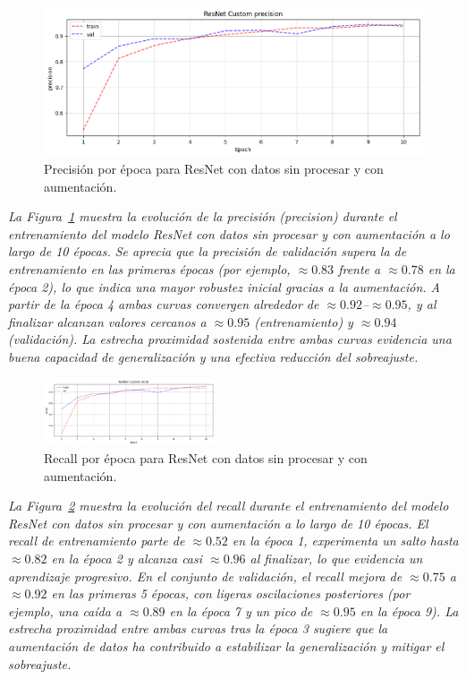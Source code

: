 \documentclass[conference]{IEEEtran}
\begin{document}
\begin{figure}[H]
    \centering
    \includegraphics[width=0.95\linewidth]{graphics-resnet-raw/resnet_raw_with_precision.png}
    \caption{Precisión por época para ResNet con datos sin procesar y con aumentación.}
    \label{fig:resnet_raw_with_precision}
\end{figure}
\noindent\textit{%
La Figura~\ref{fig:resnet_raw_with_precision} muestra la evolución de la precisión (precision) durante el entrenamiento del modelo ResNet con datos sin procesar y con aumentación a lo largo de 10 épocas. Se aprecia que la precisión de validación supera la de entrenamiento en las primeras épocas (por ejemplo, \(\approx0.83\) frente a \(\approx0.78\) en la época 2), lo que indica una mayor robustez inicial gracias a la aumentación. A partir de la época 4 ambas curvas convergen alrededor de \(\approx0.92\)–\(\approx0.95\), y al finalizar alcanzan valores cercanos a \(\approx0.95\) (entrenamiento) y \(\approx0.94\) (validación). La estrecha proximidad sostenida entre ambas curvas evidencia una buena capacidad de generalización y una efectiva reducción del sobreajuste.%
}

\begin{figure}[H]
    \centering
    \includegraphics[width=0.45\textwidth]{graphics-resnet-raw/resnet_raw_with_recall.png}
    \caption{Recall por época para ResNet con datos sin procesar y con aumentación.}
    \label{fig:resnet_raw_with_recall}
\end{figure}
\noindent\textit{%
La Figura~\ref{fig:resnet_raw_with_recall} muestra la evolución del recall durante el entrenamiento del modelo ResNet con datos sin procesar y con aumentación a lo largo de 10 épocas. El recall de entrenamiento parte de \(\approx0.52\) en la época 1, experimenta un salto hasta \(\approx0.82\) en la época 2 y alcanza casi \(\approx0.96\) al finalizar, lo que evidencia un aprendizaje progresivo. En el conjunto de validación, el recall mejora de \(\approx0.75\) a \(\approx0.92\) en las primeras 5 épocas, con ligeras oscilaciones posteriores (por ejemplo, una caída a \(\approx0.89\) en la época 7 y un pico de \(\approx0.95\) en la época 9). La estrecha proximidad entre ambas curvas tras la época 3 sugiere que la aumentación de datos ha contribuido a estabilizar la generalización y mitigar el sobreajuste.%
}
\end{document}
